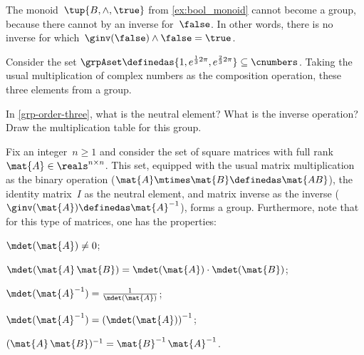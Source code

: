 \begin{example}
    The monoid~$\tup{B,\wedge, \true}$ from \cref{ex:bool_monoid} cannot become a group, because there cannot by an inverse for~$\false$. In other words, there is no inverse for which~$\ginv(\false)\wedge \false=\true$.
\end{example}
\begin{example}\label{grp-order-three}
Consider the set $\grpAset \definedas \{ 1, e^{\frac{1}{3} 2 \pi}, e^{\frac{2 }{3} 2 \pi}  \} \subseteq \cnumbers$. Taking the usual multiplication of complex numbers as the composition operation, these three elements from a group.
\end{example}

\begin{exercise}
In \cref{grp-order-three}, what is the neutral element? What is the inverse operation?
Draw the multiplication table for this group.
\end{exercise}

\begin{solution}
\end{solution}



\begin{example}\label{exa:square-full}
Fix an integer~$n\geq1 $ and consider the set of square matrices with full rank~$\mat{A} \in \reals^{n\times n}$.
This set, equipped with the usual matrix multiplication as the binary operation ($\mat{A}\mtimes \mat{B}\definedas \mat{AB}$), the identity matrix~$I$ as the neutral element, and matrix inverse as the inverse ($\ginv(\mat{A})\definedas \mat{A}^{-1}$), forms a group.
Furthermore, note that for this type of matrices, one has the properties:
\begin{compactenum}
\item $\mdet(\mat{A}) \neq 0$;
\item $\mdet(\mat{A} \, \mat{B}) = \mdet(\mat{A}) \cdot  \mdet(\mat{B})$;
\item $\mdet(\mat{A}^{-1}) = \frac{1}{\mdet(\mat{A})}$;
\item $\mdet(\mat{A}^{-1}) = \left( \mdet(\mat{A}) \right) ^ {-1}$;
\item $(\mat{A}\,\mat{B})^{-1} = {\mat{B}^{-1} \, \mat{A}^{-1}}$.
\end{compactenum}
\end{example}

